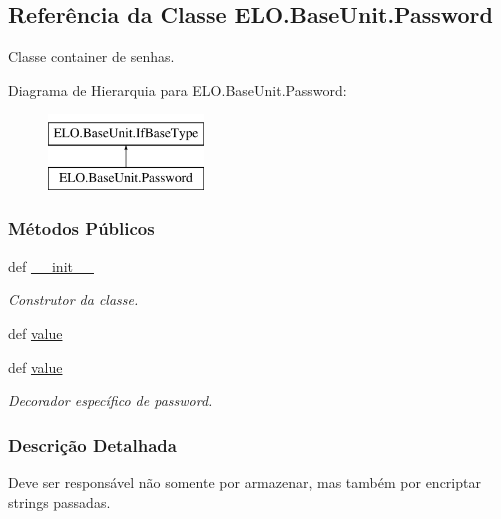\hypertarget{classELO_1_1BaseUnit_1_1Password}{\subsection{Referência da Classe E\-L\-O.\-Base\-Unit.\-Password}
\label{classELO_1_1BaseUnit_1_1Password}
}


Classe container de senhas.  


Diagrama de Hierarquia para E\-L\-O.\-Base\-Unit.\-Password\-:\begin{figure}[H]
\begin{center}
\leavevmode
\includegraphics[height=2.000000cm]{d4/df5/classELO_1_1BaseUnit_1_1Password}
\end{center}
\end{figure}
\subsubsection*{Métodos Públicos}
\begin{DoxyCompactItemize}
\item 
def \hyperlink{classELO_1_1BaseUnit_1_1Password_a01568369a90b21117ba3beb05cbf9dfe}{\-\_\-\-\_\-init\-\_\-\-\_\-}
\begin{DoxyCompactList}\small\item\em Construtor da classe. \end{DoxyCompactList}\item 
def \hyperlink{classELO_1_1BaseUnit_1_1Password_a42dcd63788a2eed3780c39f368356546}{value}
\item 
def \hyperlink{classELO_1_1BaseUnit_1_1Password_a42dcd63788a2eed3780c39f368356546}{value}
\begin{DoxyCompactList}\small\item\em Decorador específico de password. \end{DoxyCompactList}\end{DoxyCompactItemize}


\subsubsection{Descrição Detalhada}
Deve ser responsável não somente por armazenar, mas também por encriptar strings passadas. 

